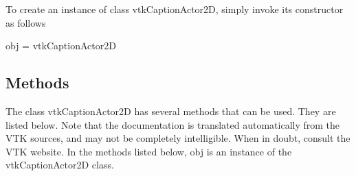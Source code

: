 To create an instance of class vtk\-Caption\-Actor2\-D, simply invoke its constructor as follows \begin{DoxyVerb}  obj = vtkCaptionActor2D
\end{DoxyVerb}
 \hypertarget{vtkwidgets_vtkxyplotwidget_Methods}{}\subsection{Methods}\label{vtkwidgets_vtkxyplotwidget_Methods}
The class vtk\-Caption\-Actor2\-D has several methods that can be used. They are listed below. Note that the documentation is translated automatically from the V\-T\-K sources, and may not be completely intelligible. When in doubt, consult the V\-T\-K website. In the methods listed below, {\ttfamily obj} is an instance of the vtk\-Caption\-Actor2\-D class. 
